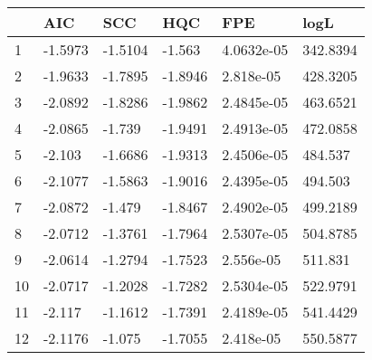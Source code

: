 \begin{tabular}{llllll}
\toprule 
& AIC & SCC & HQC & FPE & logL \\ 
\midrule 
1 & -1.5973 & -1.5104 & -1.563 & 4.0632e-05 & 342.8394 \\ 
2 & -1.9633 & -1.7895 & -1.8946 & 2.818e-05 & 428.3205 \\ 
3 & -2.0892 & -1.8286 & -1.9862 & 2.4845e-05 & 463.6521 \\ 
4 & -2.0865 & -1.739 & -1.9491 & 2.4913e-05 & 472.0858 \\ 
5 & -2.103 & -1.6686 & -1.9313 & 2.4506e-05 & 484.537 \\ 
6 & -2.1077 & -1.5863 & -1.9016 & 2.4395e-05 & 494.503 \\ 
7 & -2.0872 & -1.479 & -1.8467 & 2.4902e-05 & 499.2189 \\ 
8 & -2.0712 & -1.3761 & -1.7964 & 2.5307e-05 & 504.8785 \\ 
9 & -2.0614 & -1.2794 & -1.7523 & 2.556e-05 & 511.831 \\ 
10 & -2.0717 & -1.2028 & -1.7282 & 2.5304e-05 & 522.9791 \\ 
11 & -2.117 & -1.1612 & -1.7391 & 2.4189e-05 & 541.4429 \\ 
12 & -2.1176 & -1.075 & -1.7055 & 2.418e-05 & 550.5877 \\ 
\bottomrule 
\end{tabular}